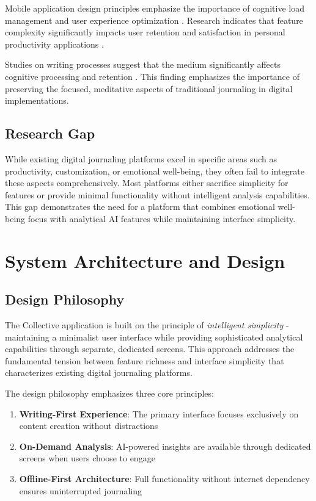 \documentclass[conference]{IEEEtran}
\begin{document}
Mobile application design principles emphasize the importance of cognitive load management and user experience optimization \cite{norman2013design}. Research indicates that feature complexity significantly impacts user retention and satisfaction in personal productivity applications \cite{kjeldskov2003review}.

Studies on writing processes suggest that the medium significantly affects cognitive processing and retention \cite{mueller2014pen}. This finding emphasizes the importance of preserving the focused, meditative aspects of traditional journaling in digital implementations.

\subsection{Research Gap}

While existing digital journaling platforms excel in specific areas such as productivity, customization, or emotional well-being, they often fail to integrate these aspects comprehensively. Most platforms either sacrifice simplicity for features or provide minimal functionality without intelligent analysis capabilities. This gap demonstrates the need for a platform that combines emotional well-being focus with analytical AI features while maintaining interface simplicity.

\section{System Architecture and Design}

\subsection{Design Philosophy}

The Collective application is built on the principle of \textit{intelligent simplicity} - maintaining a minimalist user interface while providing sophisticated analytical capabilities through separate, dedicated screens. This approach addresses the fundamental tension between feature richness and interface simplicity that characterizes existing digital journaling platforms.

The design philosophy emphasizes three core principles:
\begin{enumerate}
\item \textbf{Writing-First Experience}: The primary interface focuses exclusively on content creation without distractions
\item \textbf{On-Demand Analysis}: AI-powered insights are available through dedicated screens when users choose to engage
\item \textbf{Offline-First Architecture}: Full functionality without internet dependency ensures uninterrupted journaling
\end{enumerate}
\end{document}
